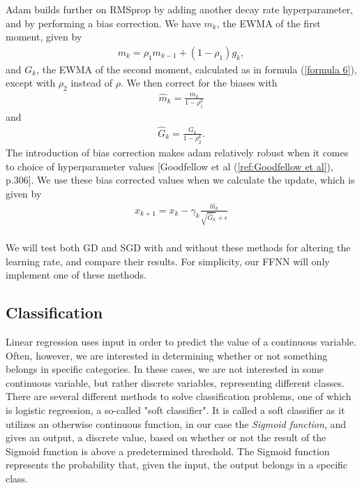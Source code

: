 \documentclass[english,notitlepage,reprint,nofootinbib]{revtex4-1}  %
\begin{document}
Adam builds further on RMSprop by adding another decay rate hyperparameter, and by performing a bias correction. We have $m_{k}$, the EWMA of the first moment, given by
\begin{align}
    m_{k} = \rho_{1} m_{k-1} + (1 - \rho_{1}) g_{k}, 
\end{align}
and $G_{k}$, the EWMA of the second moment, calculated as in formula (\ref{formula 6}), except with $\rho_{2}$ instead of $\rho$. We then correct for the biases with
\begin{align}
    \hat{m}_{k} = \frac{m_{k}}{1-\rho_{1}^{k}}
\end{align}
and
\begin{align}
    \hat{G}_{k} = \frac{G_{k}}{1-\rho_{2}^{k}}.
\end{align}
The introduction of bias correction makes adam relatively robust when it comes to choice of hyperparameter values [Goodfellow et al (\ref{ref:Goodfellow et al}), p.306]. We use these bias corrected values when we calculate the update, which is given by
\begin{align}
    x_{k+1} = x_{k} - \gamma_{k} \frac{\hat{m}_{k}}{\sqrt{\hat{G}_{k}} + \epsilon}
\end{align}
\\

We will test both GD and SGD with and without these methods for altering the learning rate, and compare their results. For simplicity, our FFNN will only implement one of these methods. %

\subsection{Classification}
Linear regression uses input in order to predict the value of a continuous variable. Often, however, we are interested in determining whether or not something belongs in specific categories. In these cases, we are not interested in some continuous variable, but rather discrete variables, representing different classes. There are several different methods to solve classification problems, one of which is logistic regression, a so-called "soft classifier". It is called a soft classifier as it utilizes an otherwise continuous function, in our case the \textit{Sigmoid function}, and gives an output, a discrete value, based on whether or not the result of the Sigmoid function is above a predetermined threshold. The Sigmoid function represents the probability that, given the input, the output belongs in a specific class. \\
\end{document}
